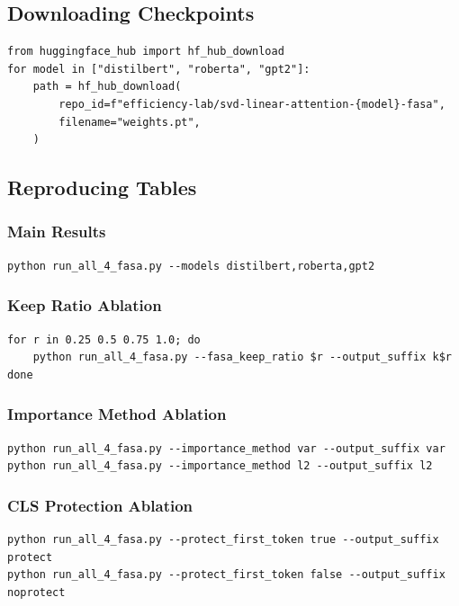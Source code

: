 \subsection{Downloading Checkpoints}

\begin{lstlisting}
from huggingface_hub import hf_hub_download
for model in ["distilbert", "roberta", "gpt2"]:
    path = hf_hub_download(
        repo_id=f"efficiency-lab/svd-linear-attention-{model}-fasa",
        filename="weights.pt",
    )
\end{lstlisting}

\subsection{Reproducing Tables}

\subsubsection{Main Results}

\begin{lstlisting}
python run_all_4_fasa.py --models distilbert,roberta,gpt2
\end{lstlisting}

\subsubsection{Keep Ratio Ablation}

\begin{lstlisting}
for r in 0.25 0.5 0.75 1.0; do
    python run_all_4_fasa.py --fasa_keep_ratio $r --output_suffix k$r
done
\end{lstlisting}

\subsubsection{Importance Method Ablation}

\begin{lstlisting}
python run_all_4_fasa.py --importance_method var --output_suffix var
python run_all_4_fasa.py --importance_method l2 --output_suffix l2
\end{lstlisting}

\subsubsection{CLS Protection Ablation}

\begin{lstlisting}
python run_all_4_fasa.py --protect_first_token true --output_suffix protect
python run_all_4_fasa.py --protect_first_token false --output_suffix noprotect
\end{lstlisting}


